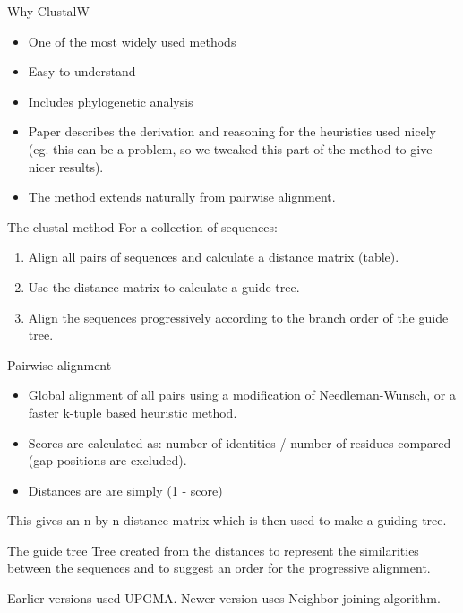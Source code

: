 \documentclass[pdf]{beamer}
\begin{document}
\begin{frame}{Why ClustalW}
  \begin{itemize}
    \item One of the most widely used methods
    \item Easy to understand
    \item Includes phylogenetic analysis
    \item Paper describes the derivation and reasoning for the heuristics used
      nicely (eg. this can be a 
      problem, so we tweaked this part of the method to give nicer results).
    \item The method extends naturally from pairwise alignment.
  \end{itemize}

\end{frame}

\begin{frame}{The clustal method}
  For a collection of sequences:
  \begin{enumerate}
  \item Align all pairs of sequences and calculate a distance matrix (table).
  \item Use the distance matrix to calculate a guide tree.
  \item Align the sequences progressively according to the branch order
    of the guide tree.
  \end{enumerate}
\end{frame}

\begin{frame}{Pairwise alignment}
  \begin{itemize}
  \item Global alignment of all pairs using a modification of Needleman-Wunsch,
    or a faster k-tuple based heuristic method.
  \item Scores are calculated as: number of identities / number of residues compared
    (gap positions are excluded).
  \item Distances are are simply (1 - score)
  \end{itemize}

  This gives an n by n distance matrix which is then used to make a guiding tree.
\end{frame}

\begin{frame}{The guide tree}
  Tree created from the distances to represent the similarities between the
  sequences and to suggest an order for the progressive alignment. 

  Earlier versions used UPGMA. Newer version uses Neighbor joining algorithm.

\end{frame}
\end{document}
